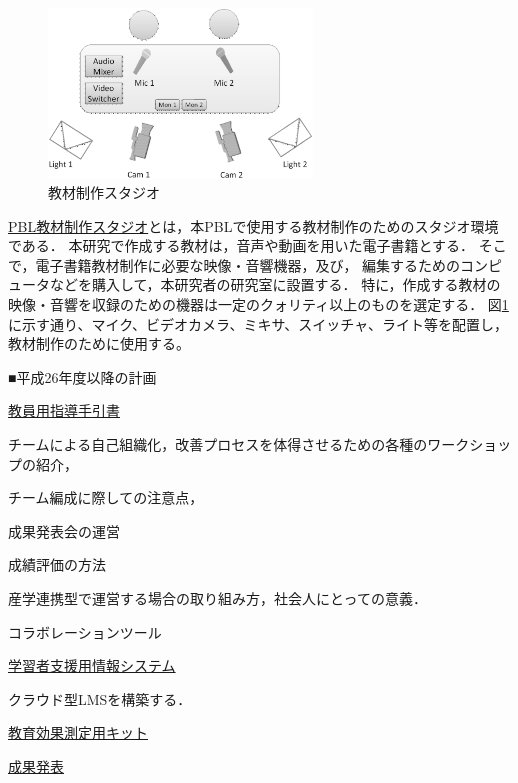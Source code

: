 \documentclass[11pt,a4paper,twoside]{jarticle}
\newcommand{\研究種別}{A}	%
\newcommand{\研究課題名}{コ・クリエイティブなソフトウェア開発者を育成するPBL型教育}
\newcommand{\研究機関名}{産業技術大学院大学}
\newcommand{\研究代表者氏名}{中鉢　欣秀}
\newcommand{\研究代表者氏名ふりがな}{ちゅうばち　よしひで}
\newcommand{\本応募effort}{\KLEffort{18}}	%
\newcommand{\研究期間の最終元号年度}{27}	%
\begin{document}
{    
         \begin{figure}
         	\begin{center}
		         \includegraphics[width=7cm]{figs/studio.eps}
		         \caption{教材制作スタジオ}
		         \label{fig:studio}
	         \end{center}
         \end{figure}

	\vspace{0.5cm}
	\underline{PBL教材制作スタジオ}とは，本PBLで使用する教材制作のためのスタジオ環境である．
	本研究で作成する教材は，音声や動画を用いた電子書籍とする．
	そこで，電子書籍教材制作に必要な映像・音響機器，及び，
	編集するためのコンピュータなどを購入して，本研究者の研究室に設置する．
	特に，作成する教材の映像・音響を収録のための機器は一定のクォリティ以上のものを選定する．
	図\ref{fig:studio}に示す通り、マイク、ビデオカメラ、ミキサ、スイッチャ、ライト等を配置し，
	教材制作のために使用する。
	

	\begin{flushleft}
		■平成26年度以降の計画
	\end{flushleft}
	
	\underline{教員用指導手引書}
	
	チームによる自己組織化，改善プロセスを体得させるための各種のワークショップの紹介，
	
	チーム編成に際しての注意点，
	
	成果発表会の運営

	成績評価の方法
	
	産学連携型で運営する場合の取り組み方，社会人にとっての意義．
	
	コラボレーションツール
	
	
	\underline{学習者支援用情報システム}

	クラウド型LMSを構築する．
	
	\underline{教育効果測定用キット}
	
	\underline{成果発表}
	
}
\end{document}
